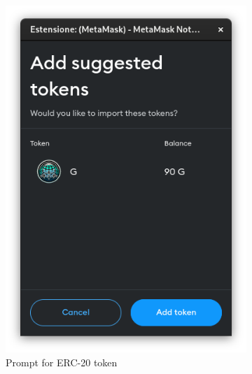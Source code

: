 \documentclass[main.tex]{subfiles}
\begin{document}
\begin{figure}[htbp]
    \centering

    \begin{subfigure}[t]{0.45\textwidth}
        \centering
        \includegraphics[width=\textwidth]{figures/metamask_prompt_add_geth_token_erc20.png}
        \caption{Prompt for ERC-20 token}
    \end{subfigure}
    \begin{subfigure}[t]{0.45\textwidth}
        \centering

\end{subfigure}
\end{figure}
\end{document}
